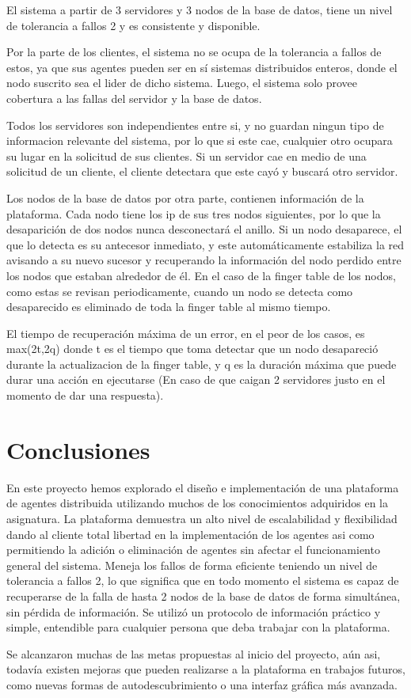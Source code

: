 \documentclass[11pt]{article}
\begin{document}
    El sistema a partir de 3 servidores y 3 nodos de la base de datos, tiene un nivel de tolerancia a 
    fallos 2 y es consistente y disponible.

    Por la parte de los clientes, el sistema no se ocupa de la tolerancia a fallos de estos, ya que sus 
    agentes pueden ser en sí sistemas distribuidos enteros, donde el nodo suscrito sea el lider de dicho 
    sistema. Luego, el sistema solo provee cobertura a las fallas del servidor y la base de datos.

    Todos los servidores son independientes entre si, y no guardan ningun tipo de informacion relevante 
    del sistema, por lo que si este cae, cualquier otro ocupara su lugar en la solicitud de sus clientes. 
    Si un servidor cae en medio de una solicitud de un cliente, el cliente detectara que este cayó y 
    buscará otro servidor.

    Los nodos de la base de datos por otra parte, contienen información de la plataforma. Cada nodo tiene 
    los ip de sus tres nodos siguientes, por lo que la desaparición de dos nodos nunca desconectará el 
    anillo. Si un nodo desaparece, el que lo detecta es su antecesor inmediato, y este automáticamente 
    estabiliza la red avisando a su nuevo sucesor y recuperando la información del nodo perdido entre los 
    nodos que estaban alrededor de él. En el caso de la finger table de los nodos, como estas se revisan 
    periodicamente, cuando un nodo se detecta como desaparecido es eliminado de toda la finger table al 
    mismo tiempo.

    El tiempo de recuperación máxima de un error, en el peor de los casos, es max(2t,2q) donde t es el 
    tiempo que toma detectar que un nodo desapareció durante la actualizacion de la finger table, y q es 
    la duración máxima que puede durar una acción en ejecutarse (En caso de que caigan 2 servidores justo 
    en el momento de dar una respuesta).

    \newpage

    \section{Conclusiones}

    En este proyecto hemos explorado el diseño e implementación de una plataforma de agentes distribuida 
    utilizando muchos de los conocimientos adquiridos en la asignatura. La plataforma demuestra un alto 
    nivel de escalabilidad y flexibilidad dando al cliente total libertad en la implementación de los 
    agentes asi como permitiendo la adición o eliminación de agentes sin afectar el funcionamiento general 
    del sistema. Meneja los fallos de forma eficiente teniendo un nivel de tolerancia a fallos 2, lo que 
    significa que en todo momento el sistema es capaz de recuperarse de la falla de hasta 2 nodos de la 
    base de datos de forma simultánea, sin pérdida de información. Se utilizó un protocolo de información 
    práctico y simple, entendible para cualquier persona que deba trabajar con la plataforma.

    Se alcanzaron muchas de las metas propuestas al inicio del proyecto, aún asi, todavía existen mejoras que 
    pueden realizarse a la plataforma en trabajos futuros, como nuevas formas de autodescubrimiento o una 
    interfaz gráfica más avanzada.
\end{document}
